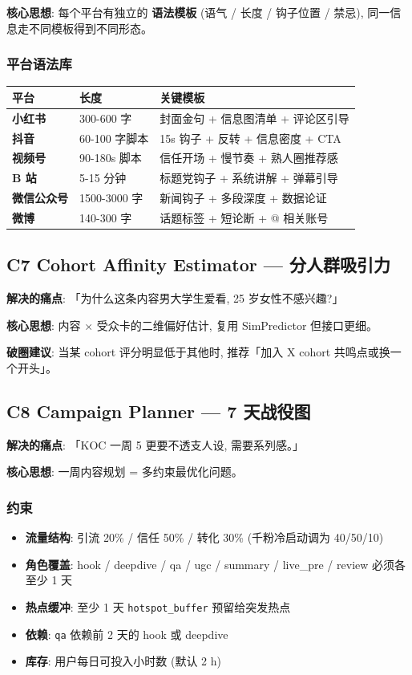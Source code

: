 \textbf{核心思想}: 每个平台有独立的 \textbf{语法模板} (语气 / 长度 / 钩子位置 / 禁忌), 同一信息走不同模板得到不同形态。

\subsubsection{平台语法库}

\begin{tabularx}{\textwidth}{>{\bfseries}l l X}
    \toprule
    平台 & 长度 & 关键模板 \\
    \midrule
    小红书 & 300-600 字 & 封面金句 + 信息图清单 + 评论区引导 \\
    抖音 & 60-100 字脚本 & 15s 钩子 + 反转 + 信息密度 + CTA \\
    视频号 & 90-180s 脚本 & 信任开场 + 慢节奏 + 熟人圈推荐感 \\
    B 站 & 5-15 分钟 & 标题党钩子 + 系统讲解 + 弹幕引导 \\
    微信公众号 & 1500-3000 字 & 新闻钩子 + 多段深度 + 数据论证 \\
    微博 & 140-300 字 & 话题标签 + 短论断 + @ 相关账号 \\
    \bottomrule
\end{tabularx}

\subsection{C7 Cohort Affinity Estimator — 分人群吸引力}

\textbf{解决的痛点}: 「为什么这条内容男大学生爱看, 25 岁女性不感兴趣?」

\textbf{核心思想}: 内容 × 受众卡的二维偏好估计, 复用 SimPredictor 但接口更细。

\textbf{破圈建议}: 当某 cohort 评分明显低于其他时, 推荐「加入 X cohort 共鸣点或换一个开头」。

\subsection{C8 Campaign Planner — 7 天战役图}

\textbf{解决的痛点}: 「KOC 一周 5 更要不透支人设, 需要系列感。」

\textbf{核心思想}: 一周内容规划 = 多约束最优化问题。

\subsubsection{约束}

\begin{itemize}
    \item \textbf{流量结构}: 引流 20\% / 信任 50\% / 转化 30\% (千粉冷启动调为 40/50/10)
    \item \textbf{角色覆盖}: hook / deepdive / qa / ugc / summary / live\_pre / review 必须各至少 1 天
    \item \textbf{热点缓冲}: 至少 1 天 \texttt{hotspot\_buffer} 预留给突发热点
    \item \textbf{依赖}: \texttt{qa} 依赖前 2 天的 hook 或 deepdive
    \item \textbf{库存}: 用户每日可投入小时数 (默认 2 h)
\end{itemize}

